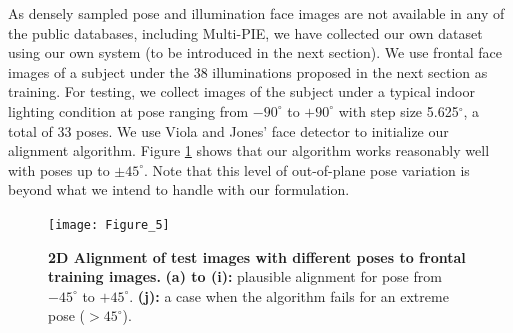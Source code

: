\documentclass[10pt,journal,letterpaper,compsoc]{IEEEtran}
\begin{document}
 As densely sampled pose
and
    illumination face images are not available in any of
    the public databases, including Multi-PIE, we have
    collected our own dataset using our own system (to be
    introduced in the next section). We use frontal face
    images of a subject under the 38 illuminations proposed
    in the next section as training. For testing, we
    collect images of the subject under a typical indoor
    lighting condition at pose ranging from $-90^\circ$ to
    $+90^\circ$ with step size 5.625$^\circ$, a total of 33
    poses. We use Viola and Jones' face detector to
    initialize our alignment algorithm.
Figure \ref{fig:pose-alignment} shows that our algorithm works reasonably well with poses up
to $\pm 45^\circ$.
Note that this level of out-of-plane
 pose variation is beyond what we intend to handle with our formulation.
\begin{figure}
\centering
\texttt{[image: Figure\_5]}
\caption{{\bf 2D Alignment of test images with different poses to frontal training images.} {\bf (a) to (i):}  plausible alignment for pose from $-45^{\circ}$
to $+45^{\circ}$. {\bf (j):} a case when the algorithm fails for an extreme pose ($>45^{\circ}$).
}\label{fig:pose-alignment} \vspace{-8mm}
\end{figure}
\end{document}

